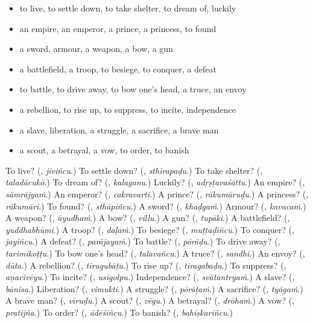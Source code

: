 \begin{itemize}
\raggedright
  \item to live, to settle down, to take shelter, to dream of, luckily
  \item an empire, an emperor, a prince, a princess, to found
  \item a sword, armour, a weapon, a bow, a gun
  \item a battlefield, a troop, to besiege, to conquer, a defeat
  \item to battle, to drive away, to bow one's head, a truce, an envoy
  \item a rebellion, to rise up, to suppress, to incite, independence
  \item a slave, liberation, a struggle, a sacrifice, a brave man
  \item a scout, a betrayal, a vow, to order, to banish
\end{itemize}

\begin{tcolorbox}[breakable,colback=teal!4,colframe=teal!35!black,title={Before you move on}]
To live? (\textbf{}, \emph{jīviñcu}.) To settle down? (\textbf{}, \emph{sthirapaḍu}.) To take shelter? (\textbf{}, \emph{taladācukō}.) To dream of? (\textbf{}, \emph{kalaganu}.) Luckily? (\textbf{}, \emph{adṛṣṭavaśāttu}.) An empire? (\textbf{}, \emph{sāmrājyaṁ}.) An emperor? (\textbf{}, \emph{cakravarti}.) A prince? (\textbf{}, \emph{rākumāruḍu}.) A princess? (\textbf{}, \emph{rākumāri}.) To found? (\textbf{}, \emph{sthāpiñcu}.) A sword? (\textbf{}, \emph{khaḍgaṁ}.) Armour? (\textbf{}, \emph{kavacaṁ}.) A weapon? (\textbf{}, \emph{āyudhaṁ}.) A bow? (\textbf{}, \emph{villu}.) A gun? (\textbf{}, \emph{tupāki}.) A battlefield? (\textbf{}, \emph{yuddhabhūmi}.) A troop? (\textbf{}, \emph{daḷaṁ}.) To besiege? (\textbf{}, \emph{muṭṭaḍiñcu}.) To conquer? (\textbf{}, \emph{jayiñcu}.) A defeat? (\textbf{}, \emph{parājayaṁ}.) To battle? (\textbf{}, \emph{pōrāḍu}.) To drive away? (\textbf{}, \emph{tarimikoṭṭu}.) To bow one's head? (\textbf{}, \emph{talavañcu}.) A truce? (\textbf{}, \emph{sandhi}.) An envoy? (\textbf{}, \emph{dūta}.) A rebellion? (\textbf{}, \emph{tirugubāṭu}.) To rise up? (\textbf{}, \emph{tiragabaḍu}.) To suppress? (\textbf{}, \emph{aṇacivēyu}.) To incite? (\textbf{}, \emph{usigolpu}.) Independence? (\textbf{}, \emph{svātantryaṁ}.) A slave? (\textbf{}, \emph{bānisa}.) Liberation? (\textbf{}, \emph{vimukti}.) A struggle? (\textbf{}, \emph{pōrāṭaṁ}.) A sacrifice? (\textbf{}, \emph{tyāgaṁ}.) A brave man? (\textbf{}, \emph{vīruḍu}.) A scout? (\textbf{}, \emph{vēgu}.) A betrayal? (\textbf{}, \emph{drōhaṁ}.) A vow? (\textbf{}, \emph{pratijña}.) To order? (\textbf{}, \emph{ādēśiñcu}.) To banish? (\textbf{}, \emph{bahiṣkariñcu}.)
\end{tcolorbox}
